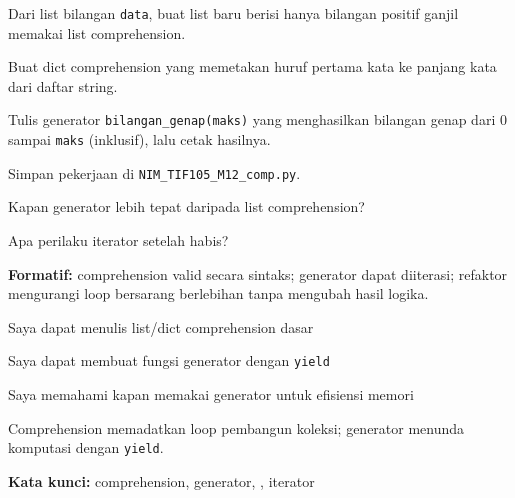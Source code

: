 \documentclass[../main.tex]{subfiles}
\begin{document}
\begin{aktivitas}
  \item Dari list bilangan \texttt{data}, buat list baru berisi hanya bilangan positif ganjil memakai list comprehension.
  \item Buat dict comprehension yang memetakan huruf pertama kata ke panjang kata dari daftar string.
  \item Tulis generator \texttt{bilangan\_genap(maks)} yang menghasilkan bilangan genap dari 0 sampai \texttt{maks} (inklusif), lalu cetak hasilnya.
  \item Simpan pekerjaan di \texttt{NIM\_TIF105\_M12\_comp.py}.
\end{aktivitas}

\begin{latihan}
  \item Kapan generator lebih tepat daripada list comprehension?
  \item Apa perilaku iterator setelah habis?
\end{latihan}

\begin{asesmen}
\textbf{Formatif:} comprehension valid secara sintaks; generator dapat diiterasi; refaktor mengurangi loop bersarang berlebihan tanpa mengubah hasil logika.
\end{asesmen}

\begin{checklist}
  \item Saya dapat menulis list/dict comprehension dasar
  \item Saya dapat membuat fungsi generator dengan \texttt{yield}
  \item Saya memahami kapan memakai generator untuk efisiensi memori
\end{checklist}

\begin{rangkuman}
Comprehension memadatkan loop pembangun koleksi; generator menunda komputasi dengan \texttt{yield}.

\textbf{Kata kunci:} comprehension, generator, , iterator
\end{rangkuman}
\end{document}
